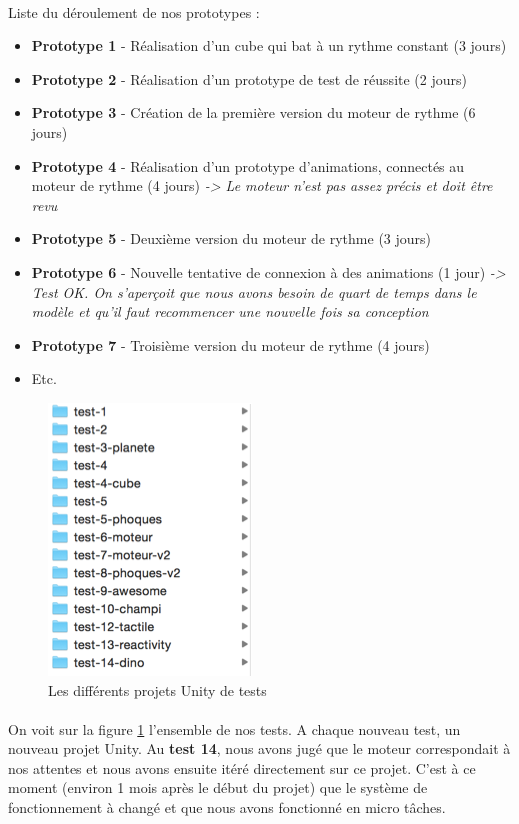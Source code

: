 \paragraph{}
Liste du déroulement de nos prototypes :

\begin{itemize}
\item \textbf{Prototype 1} - Réalisation d’un cube qui bat à un rythme constant (3 jours)
\item \textbf{Prototype 2} - Réalisation d’un prototype de test de réussite (2 jours)
\item \textbf{Prototype 3} - Création de la première version du moteur de rythme (6 jours)
\item \textbf{Prototype 4} - Réalisation d’un prototype d’animations, connectés au moteur de rythme (4 jours) \emph{-> Le moteur n’est pas assez précis et doit être revu}
\item \textbf{Prototype 5} - Deuxième version du moteur de rythme (3 jours)
\item \textbf{Prototype 6} - Nouvelle tentative de connexion à des animations (1 jour) \emph{-> Test OK. On s’aperçoit que nous avons besoin de quart de temps dans le modèle et qu’il faut recommencer une nouvelle fois sa conception}
\item \textbf{Prototype 7} - Troisième version du moteur de rythme (4 jours)
\item Etc.
\end{itemize}
 
\begin{figure}[H]\centering
  \includegraphics[scale=1]{./img/list-tests.png}
  \caption{Les différents projets Unity de tests}
  \label{listte}
\end{figure}
 
\paragraph{}
On voit sur la figure \ref{listte} l'ensemble de nos tests. A chaque nouveau test, un nouveau projet Unity. Au \textbf{test 14}, nous avons jugé que le moteur correspondait à nos attentes et nous avons ensuite itéré directement sur ce projet. C’est à ce moment (environ 1 mois après le début du projet) que le système de fonctionnement à changé et que nous avons fonctionné en micro tâches.
 
